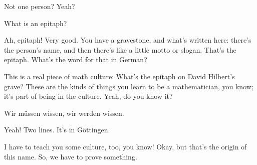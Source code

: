 \begin{speech}[00:49:48 - 00:49:52]
Not one person? Yeah?
\end{speech}

\begin{student}
What is an epitaph?
\end{student}

\begin{speech}[00:49:52 - 00:50:20]
Ah, epitaph! Very good. You have a gravestone,  and what's written here: there's the person's name, and then there's like a little motto or slogan. That's the epitaph. What's the word for that in German?

This is a real piece of math culture: What's the epitaph on David Hilbert's grave? These are the kinds of things you learn to be a mathematician, you know; it's part of being in the culture. Yeah, do you know it?
\end{speech}

\begin{student}
Wir müssen wissen, wir werden wissen.
\end{student}

\begin{speech}[00:50:20 - 00:50:43]
Yeah!  Two lines. It's in Göttingen. 

I have to teach you some culture, too, you know! Okay, but that's the origin of this name. So, we have to prove something.
\end{speech}

\begin{content}
\begin{center}
\end{center}
\end{content}


